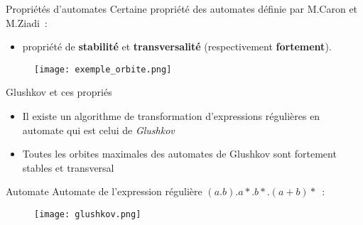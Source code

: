 \documentclass[aspectratio=169,xcolor=dvipsnames]{beamer}
\begin{document}

\begin{frame}
    \begin{block}{Propriétés d'automates}
        Certaine propriété des automates définie par M.Caron et M.Ziadi~:
        \begin{itemize}
            \item propriété de \textbf{stabilité} et \textbf{transversalité} 
            (respectivement \textbf{fortement}).
        \end{itemize}
    \end{block}
    \begin{figure}
        \texttt{[image: exemple\_orbite.png]}
    \end{figure}
\end{frame}


\begin{frame}
    \begin{block}{Glushkov et ces propriés}
        \begin{itemize}
            \item[\textbullet] Il existe un algorithme de transformation 
                d'expressions régulières en automate qui est celui de 
                \textit{Glushkov}
            
            \item[\textbullet] Toutes les orbites maximales des automates de 
                Glushkov sont fortement stables et transversal
        \end{itemize}
    \end{block}
\end{frame}



\begin{frame}
    \begin{block}{Automate}
        Automate de l'expression régulière \((a.b).a*.b*.(a+b)*\)~: 
    \end{block}
    \begin{figure}
        \texttt{[image: glushkov.png]}
    \end{figure}
\end{frame}
\end{document}
